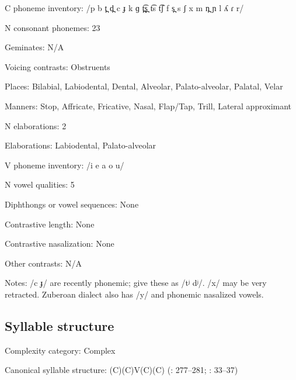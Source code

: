 {\begin{appendixdesc}
\item[C phoneme inventory:] /p b t̪ d̪ c ɟ k ɡ t̪͡s̪ t͡s t͡ʃ f s̪ s ʃ x m n̪ ɲ l ʎ ɾ r/

\item[N consonant phonemes:] 23

\item[Geminates:] N/A

\item[Voicing contrasts:] Obstruents

\item[Places:] Bilabial, Labiodental, Dental, Alveolar, Palato-alveolar, Palatal, Velar

\item[Manners:] Stop, Affricate, Fricative, Nasal, Flap/Tap, Trill, Lateral approximant

\item[N elaborations:] 2

\item[Elaborations:] Labiodental, Palato-alveolar

\item[V phoneme inventory:] /i e a o u/

\item[N vowel qualities:] 5

\item[Diphthongs or vowel sequences:] None

\item[Contrastive length:] None

\item[Contrastive nasalization:] None

\item[Other contrasts:] N/A

\item[Notes:] /c ɟ/ are recently phonemic; \citet{SaltarelliEtAl1988} give these as /tʲ dʲ/. /x/ may be very retracted. Zuberoan dialect also has /y/ and phonemic nasalized vowels.
\end{appendixdesc}
\subsection*{Syllable structure}
\begin{appendixdesc}

\item[Complexity category:] Complex

\item[Canonical syllable structure:] (C)(C)V(C)(C) (\citealt{SaltarelliEtAl1988}: 277--281; \citealt{Hualde2003}: 33--37)


\end{appendixdesc}}
